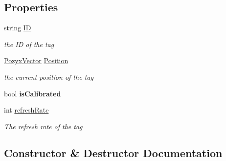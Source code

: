 \subsection*{Properties}
\begin{DoxyCompactItemize}
\item 
string \hyperlink{class_pozyx_positioner_1_1_framework_1_1_tag_a0d75eeca4dea7088e2b4a60230c13012}{ID}
\begin{DoxyCompactList}\small\item\em the ID of the tag \end{DoxyCompactList}\item 
\hyperlink{struct_pozyx_positioner_1_1_framework_1_1_pozyx_vector}{Pozyx\+Vector} \hyperlink{class_pozyx_positioner_1_1_framework_1_1_tag_a0b1b836b4e64ae70171587a2bcde4d71}{Position}
\begin{DoxyCompactList}\small\item\em the current position of the tag \end{DoxyCompactList}\item 
\mbox{\label{class_pozyx_positioner_1_1_framework_1_1_tag_a02cdde9c3303a18f28453056939bf045}} 
bool {\bfseries is\+Calibrated}
\item 
int \hyperlink{class_pozyx_positioner_1_1_framework_1_1_tag_a9010e57016df0a932c5ce8f8584ff5f9}{refresh\+Rate}
\begin{DoxyCompactList}\small\item\em The refresh rate of the tag \end{DoxyCompactList}\end{DoxyCompactItemize}


\subsection{Constructor \& Destructor Documentation}
\mbox{\label{class_pozyx_positioner_1_1_framework_1_1_tag_a9b58a1a5756bf3c8cda1e2afd32276b2}} 
